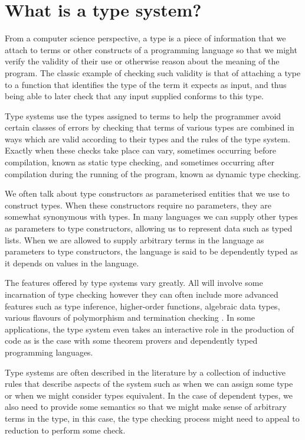 \chapter{What is a type system?}

From a computer science perspective, a type is a piece of information
that we attach to terms or other constructs of a programming language
so that we might verify the validity of their use or otherwise reason
about the meaning of the program. The classic example of checking such
validity is that of attaching a type to a function that identifies
the type of the term it expects as input, and thus being able to later
check that any input supplied conforms to this type.

Type systems use the types assigned to terms to help the
programmer avoid certain classes of errors by checking that terms of
various types are combined in ways which are valid according to
their types and the rules of the type system. Exactly when these
checks take place can vary, sometimes occurring before compilation,
known as static type checking, and sometimes occurring after
compilation during the running of the program, known as dynamic type
checking.

We often talk about type constructors as parameterised entities that
we use to construct types. When these constructors require no
parameters, they are somewhat synonymous with types. In many languages
we can supply other types as parameters to type
constructors, allowing us to represent data such as typed lists. When
we are allowed to supply arbitrary terms in the language as
parameters to type constructors, the language is said to be
dependently typed as it depends on values in the language.

The features offered by type systems vary greatly. All will involve
some incarnation of type checking however they can often include
more advanced features such as type inference, higher-order functions,
algebraic data types, various flavours of polymorphism and termination
checking \cite{Abel_2004}. In some applications, the type system even
takes an interactive role in the production of code as is the case
with some theorem provers and dependently typed programming languages. 

Type systems are often described in the literature by a collection of
inductive rules that describe aspects of the system such as when we
can assign some type or when we might consider types
equivalent. In the case of dependent types, we also need to provide
some semantics so that we might make sense of arbitrary terms in the
type, in this case, the type checking process might need to appeal to
reduction to perform some check.
